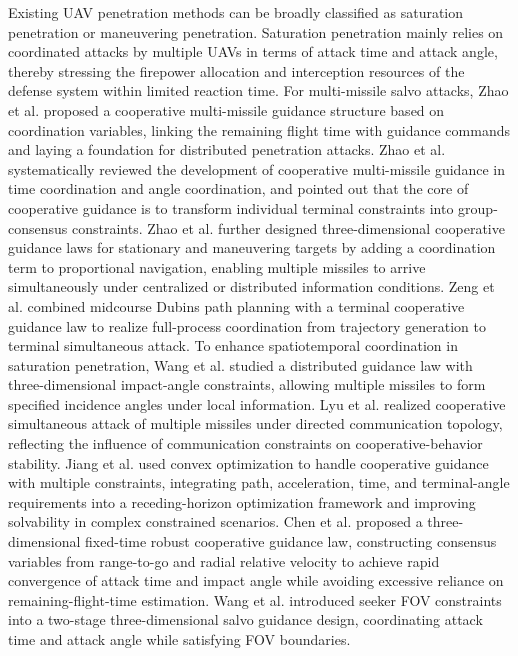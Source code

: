 \documentclass{cja}
\begin{document}
Existing UAV penetration methods can be broadly classified as saturation penetration or maneuvering penetration.
Saturation penetration mainly relies on coordinated attacks by multiple UAVs in terms of attack time and attack angle, thereby stressing the firepower allocation and interception resources of the defense system within limited reaction time. For multi-missile salvo attacks, Zhao et al.\cite{ZhaoZhou2008AAS} proposed a cooperative multi-missile guidance structure based on coordination variables, linking the remaining flight time with guidance commands and laying a foundation for distributed penetration attacks. Zhao et al.\cite{ZhaoYang2017AAS} systematically reviewed the development of cooperative multi-missile guidance in time coordination and angle coordination, and pointed out that the core of cooperative guidance is to transform individual terminal constraints into group-consensus constraints. Zhao et al.\cite{Zhao2015CJA} further designed three-dimensional cooperative guidance laws for stationary and maneuvering targets by adding a coordination term to proportional navigation, enabling multiple missiles to arrive simultaneously under centralized or distributed information conditions. Zeng et al.\cite{Zeng2018CJA} combined midcourse Dubins path planning with a terminal cooperative guidance law to realize full-process coordination from trajectory generation to terminal simultaneous attack. To enhance spatiotemporal coordination in saturation penetration, Wang et al.\cite{WangLu2018ISA} studied a distributed guidance law with three-dimensional impact-angle constraints, allowing multiple missiles to form specified incidence angles under local information. Lyu et al.\cite{Lyu2019AST} realized cooperative simultaneous attack of multiple missiles under directed communication topology, reflecting the influence of communication constraints on cooperative-behavior stability. Jiang et al.\cite{Jiang2018AST} used convex optimization to handle cooperative guidance with multiple constraints, integrating path, acceleration, time, and terminal-angle requirements into a receding-horizon optimization framework and improving solvability in complex constrained scenarios. Chen et al.\cite{Chen2021AST} proposed a three-dimensional fixed-time robust cooperative guidance law, constructing consensus variables from range-to-go and radial relative velocity to achieve rapid convergence of attack time and impact angle while avoiding excessive reliance on remaining-flight-time estimation. Wang et al.\cite{Ai2019FOVSalvo} introduced seeker FOV constraints into a two-stage three-dimensional salvo guidance design, coordinating attack time and attack angle while satisfying FOV boundaries.
\end{document}
